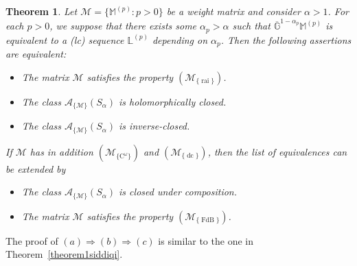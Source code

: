 \documentclass[11pt,a4paper]{article}
\theoremstyle{plain}
\newtheorem{theorem}[proposition]{Theorem}
\theoremstyle{definition}
\newcommand{\NN}{\mathbb{N}}
\newcommand{\M}{\mathbb{M}}
\newcommand{\LL}{\mathbb{L}}
\newcommand{\G}{\mathbb{G}}
\let\on=\operatorname
\begin{document}
\begin{theorem}\label{theorem1siddiqi.}
	Let $\mathcal{M}=\{\M^{(p)}: p>0\}$ be a weight matrix and consider $\alpha> 1$. For each $p>0$, we suppose that there exists some $\alpha_p>\alpha$ such that $\overline{\G}^{1-\alpha_p}\M^{(p)}$ is equivalent to a (lc) sequence $\LL^{(p)}$ depending on $\alpha_p$. Then the following assertions are equivalent:
	\begin{itemize}
		\item[$(a)$] The matrix $\mathcal{M}$ satisfies the property \hyperlink{R-rai}{$(\mathcal{M}_{\{\on{rai}\}})$}.
		
		\item[$(b)$] The class $\mathcal{A}_{\{\mathcal{M}\}}(S_{\alpha})$ is holomorphically closed.
		
		
		\item[$(c)$] The class $\mathcal{A}_{\{\mathcal{M}
			\}}(S_{\alpha})$ is inverse-closed.
		
	\end{itemize}
	If $\mathcal{M}$ has in addition \hyperlink{R-Comega}{$(\mathcal{M}_{\{\text{C}^{\omega}\}})$} and \hyperlink{R-dc}{$(\mathcal{M}_{\{\on{dc}\}})$}, then the list of equivalences can be extended by
	
	\begin{itemize}
		\item[$(d)$] The class $\mathcal{A}_{\{\mathcal{M}\}}(S_{\alpha})$ is closed under composition.
		
		\item[$(e)$] The matrix $\mathcal{M}$ satisfies the property \hyperlink{R-FdB}{$(\mathcal{M}_{\{\on{FdB}\}})$}.
	\end{itemize}
\end{theorem}

%
%
 The proof of $(a)\Rightarrow(b)\Rightarrow(c)$ is similar to the one in Theorem~\ref{theorem1siddiqi}.

%
\end{document}
